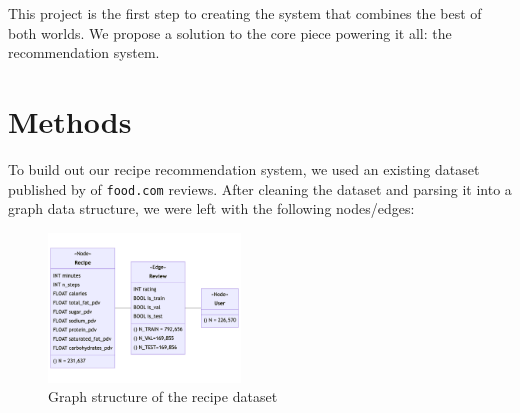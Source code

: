 \documentclass{article}
\begin{document}
This project is the first step to creating the system that combines the best of both worlds. We propose a solution to the core piece powering it all: the recommendation system.

\section{Methods}


To build out our recipe recommendation system, we used an existing dataset published by \citet{recipegen} of \verb|food.com| reviews. After cleaning the dataset and parsing it into a graph data structure, we were left with the following nodes/edges:

\begin{figure}[h]
  \centering
  \includegraphics[height=150px]{figures/schema.png}
  \caption{Graph structure of the recipe dataset}
  \label{fig:recipe_graph}
\end{figure}
\end{document}
